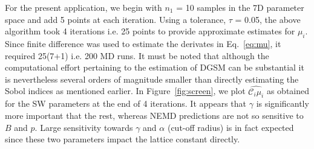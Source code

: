 For the present application, we begin with $n_1$ = 10 samples in the 7D parameter space and add 5 points
at each iteration. Using a tolerance, $\tau$ = 0.05, the above algorithm took 4 iterations i.e. 25 points to 
provide approximate estimates for $\mu_i$. Since finite difference was used to estimate the derivates in
Eq.~\ref{eq:mu}, it required 25(7+1) i.e. 200 MD runs. It must be noted that although the computational effort
pertaining to the estimation of DGSM can be substantial it is nevertheless several orders of magnitude smaller
than directly estimating the Sobol indices as mentioned earlier. 
In Figure~\ref{fig:screen}, we plot $\hat{\mathcal{C}_i\mu_i}$ as obtained for the SW parameters at the 
end of 4 iterations. It appears that $\gamma$ is significantly more important that the rest, whereas NEMD
predictions are not so sensitive to $B$ and $p$. Large sensitivity towards $\gamma$ and $\alpha$ (cut-off radius)
 is in fact expected since  these two parameters impact the lattice constant directly. 


























